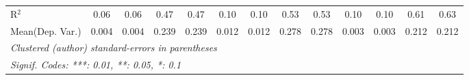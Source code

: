 \begin{tabular}{lcccccccccccc}
   R$^2$                                    & 0.06          & 0.06            & 0.47    & 0.47          & 0.10          & 0.10          & 0.53         & 0.53    & 0.10           & 0.10            & 0.61    & 0.63\\  
Mean(Dep. Var.) & 0.004 & 0.004 & 0.239 & 0.239 & 0.012 & 0.012 & 0.278 & 0.278 & 0.003 & 0.003 & 0.212 & 0.212 \\
   \midrule \midrule
   \multicolumn{13}{l}{\emph{Clustered (author) standard-errors in parentheses}}\\
   \multicolumn{13}{l}{\emph{Signif. Codes: ***: 0.01, **: 0.05, *: 0.1}}\\
\end{tabular}
\par\endgroup
